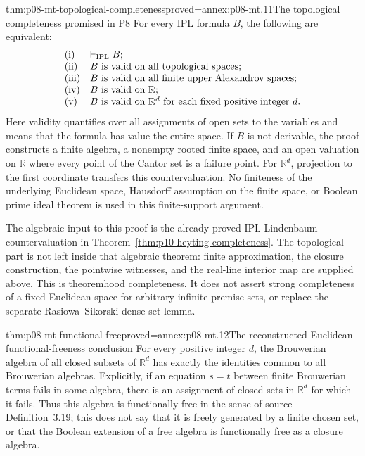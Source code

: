 \begin{hbtheorem}{thm:p08-mt-topological-completeness}{proved=annex:p08-mt.11}{The topological completeness promised in P8}
For every IPL formula \(B\), the following are equivalent:
\[
 \begin{array}{ll}
 \textnormal{(i)}&\vdash_{\mathrm{IPL}}B;\\
 \textnormal{(ii)}&B\textnormal{ is valid on all topological spaces};\\
 \textnormal{(iii)}&B\textnormal{ is valid on all finite upper Alexandrov spaces};\\
 \textnormal{(iv)}&B\textnormal{ is valid on }\mathbb R;\\
 \textnormal{(v)}&B\textnormal{ is valid on }\mathbb R^d
                    \textnormal{ for each fixed positive integer }d.
 \end{array}
\]
Here validity quantifies over all assignments of open sets to the
variables and means that the formula has value the entire space.
If \(B\) is not derivable, the proof constructs a finite algebra, a
nonempty rooted finite space, and an open valuation on \(\mathbb R\)
where every point of the Cantor set is a failure point. For
\(\mathbb R^d\), projection to the first coordinate transfers this
countervaluation. No finiteness of the underlying Euclidean space,
Hausdorff assumption on the finite space, or Boolean prime ideal theorem
is used in this finite-support argument.
\end{hbtheorem}

The algebraic input to this proof is the already proved IPL Lindenbaum
countervaluation in Theorem~\ref{thm:p10-heyting-completeness}.
The topological part is not left inside that algebraic theorem: finite
approximation, the closure construction, the pointwise witnesses, and
the real-line interior map are supplied above. This is theoremhood
completeness. It does not assert strong completeness of a fixed
Euclidean space for arbitrary infinite premise sets, or replace the
separate Rasiowa--Sikorski dense-set lemma.

\begin{hbcorollary}{thm:p08-mt-functional-free}{proved=annex:p08-mt.12}{The reconstructed Euclidean functional-freeness conclusion}
For every positive integer \(d\), the Brouwerian algebra of all closed
subsets of \(\mathbb R^d\) has exactly the identities common to all
Brouwerian algebras. Explicitly, if an equation \(s=t\) between finite
Brouwerian terms fails in some algebra, there is an assignment of closed
sets in \(\mathbb R^d\) for which it fails.
Thus this algebra is functionally free in the sense of source
Definition~3.19; this does not say that it is freely generated by a
finite chosen set, or that the Boolean extension of a free algebra is
functionally free as a closure algebra.
\end{hbcorollary}


